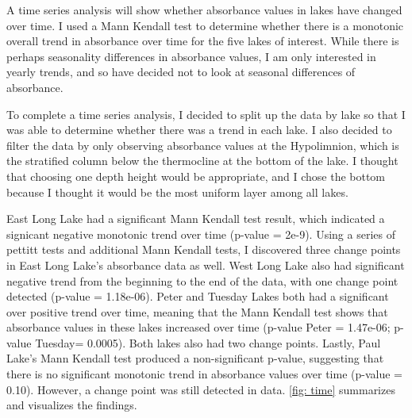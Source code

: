 \documentclass[12pt,]{article}
\newenvironment{Shaded}{\begin{snugshade}}{\end{snugshade}}
\newcommand{\KeywordTok}[1]{\textcolor[rgb]{0.13,0.29,0.53}{\textbf{#1}}}
\newcommand{\StringTok}[1]{\textcolor[rgb]{0.31,0.60,0.02}{#1}}
\newcommand{\CommentTok}[1]{\textcolor[rgb]{0.56,0.35,0.01}{\textit{#1}}}
\newcommand{\OperatorTok}[1]{\textcolor[rgb]{0.81,0.36,0.00}{\textbf{#1}}}
\newcommand{\NormalTok}[1]{#1}
\begin{document}
A time series analysis will show whether absorbance values in lakes have
changed over time. I used a Mann Kendall test to determine whether there
is a monotonic overall trend in absorbance over time for the five lakes
of interest. While there is perhaps seasonality differences in
absorbance values, I am only interested in yearly trends, and so have
decided not to look at seasonal differences of absorbance.

To complete a time series analysis, I decided to split up the data by
lake so that I was able to determine whether there was a trend in each
lake. I also decided to filter the data by only observing absorbance
values at the Hypolimnion, which is the stratified column below the
thermocline at the bottom of the lake. I thought that choosing one depth
height would be appropriate, and I chose the bottom because I thought it
would be the most uniform layer among all lakes.

East Long Lake had a significant Mann Kendall test result, which
indicated a signicant negative monotonic trend over time (p-value =
2e-9). Using a series of pettitt tests and additional Mann Kendall
tests, I discovered three change points in East Long Lake's absorbance
data as well. West Long Lake also had significant negative trend from
the beginning to the end of the data, with one change point detected
(p-value = 1.18e-06). Peter and Tuesday Lakes both had a significant
over positive trend over time, meaning that the Mann Kendall test shows
that absorbance values in these lakes increased over time (p-value Peter
= 1.47e-06; p-value Tuesday= 0.0005). Both lakes also had two change
points. Lastly, Paul Lake's Mann Kendall test produced a non-significant
p-value, suggesting that there is no significant monotonic trend in
absorbance values over time (p-value = 0.10). However, a change point
was still detected in data. \autoref{fig: time} summarizes and
visualizes the findings.

\begin{Shaded}
\end{Shaded}
\end{document}
